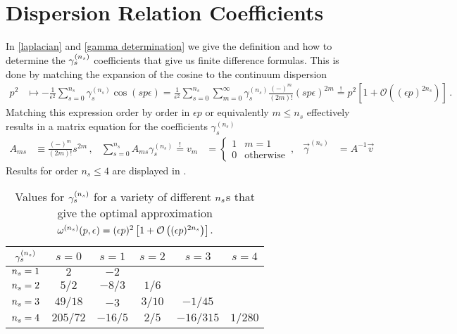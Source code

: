 
\section{Dispersion Relation Coefficients}\label{sec:coefficients}

In \eqref{laplacian} and \eqref{gamma determination} we give the definition and how to determine the $\gamma_s^{({n_s})}$ coefficients that give us finite difference formulas.
This is done by matching the expansion of the cosine to the continuum dispersion
\begin{align}
	p^2
	&\mapsto
	- \frac{1}{\epsilon^2}\sum_{s=0}^{n_s} \gamma_s^{(n_s)} \cos(s p \epsilon)
	=
	\frac{1}{\epsilon^2}\sum_{s=0}^{n_s} \sum_{m=0}^\infty \gamma_s^{(n_s)}\frac{(-)^m}{(2m)!} (s p \epsilon)^{2m}
	\overset{!}{=}
	p^2 \left[ 1 + \mathcal O \left( (\epsilon p)^{2 n_s} \right) \right]
	\, .
\end{align}
Matching this expression order by order in $\epsilon p$ or equivalently $m \leq n_s$ effectively results in a matrix equation for the coefficients $\gamma_s^{(n_s)}$
\begin{align}
	A_{ms} &\equiv \frac{(-)^m}{(2m)!} s^{2m}
	\, , &
	\sum_{s=0}^{n_s} A_{m s} \gamma_s^{(n_s)}
	\overset{!}{=}
	v_m
	&=
	\begin{cases}
		1 & m=1 \\ 0 & \text{otherwise}
	\end{cases}
	\, , &
	\vec \gamma^{(n_s)}
	&= A^{-1} \vec v
\end{align}
Results for order $n_s \leq 4$ are displayed in .

\begin{table}[ht]
    \caption{Values for $\gamma_s^{({n_s})}$ for a variety of different ${n_s}$s that give the optimal approximation $\omega^{({n_s})}(p,\epsilon) = (\epsilon p)^2\left[1+ \mathcal{O}\left((\epsilon p)^{2 {n_s}}\right)\right]$.}
    \label{tab:dispersion coefficients}
    \begin{tabular}{c | ccccc}
        $\gamma_s^{({n_s})}$   &   $s=0$   &   $s=1$   &   $s=2$   &   $s=3$       &   $s=4$   \\ \hline
        ${n_s}=1$              &   $2$     &   $-2$    &           &               &           \\
        ${n_s}=2$              &   $5/2$   &   $-8/3$  &   $1/6$   &               &           \\
        ${n_s}=3$              &   $49/18$ &   $-3$    &   $3/10$  &   $-1/45$     &           \\
        ${n_s}=4$              &   $205/72$&   $-16/5$ &   $2/5$   &   $-16/315$   &   $1/280$
    \end{tabular}
\end{table}
